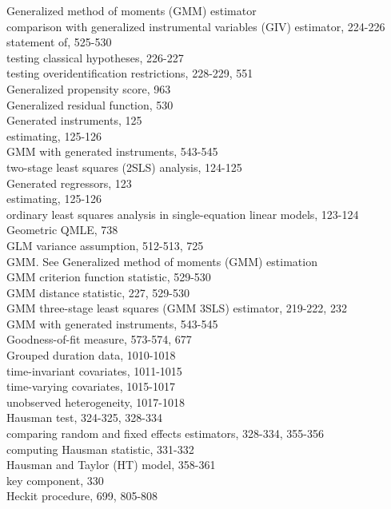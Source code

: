 \documentclass[10pt]{article}
\begin{document}
Generalized method of moments (GMM) estimator\\
comparison with generalized instrumental variables (GIV) estimator, 224-226\\
statement of, 525-530\\
testing classical hypotheses, 226-227\\
testing overidentification restrictions, 228-229, 551\\
Generalized propensity score, 963\\
Generalized residual function, 530\\
Generated instruments, 125\\
estimating, 125-126\\
GMM with generated instruments, 543-545\\
two-stage least squares (2SLS) analysis, 124-125\\
Generated regressors, 123\\
estimating, 125-126\\
ordinary least squares analysis in single-equation linear models, 123-124\\
Geometric QMLE, 738\\
GLM variance assumption, 512-513, 725\\
GMM. See Generalized method of moments (GMM) estimation\\
GMM criterion function statistic, 529-530\\
GMM distance statistic, 227, 529-530\\
GMM three-stage least squares (GMM 3SLS) estimator, 219-222, 232\\
GMM with generated instruments, 543-545\\
Goodness-of-fit measure, 573-574, 677\\
Grouped duration data, 1010-1018\\
time-invariant covariates, 1011-1015\\
time-varying covariates, 1015-1017\\
unobserved heterogeneity, 1017-1018\\
Hausman test, 324-325, 328-334\\
comparing random and fixed effects estimators, 328-334, 355-356\\
computing Hausman statistic, 331-332\\
Hausman and Taylor (HT) model, 358-361\\
key component, 330\\
Heckit procedure, 699, 805-808\\
\end{document}
